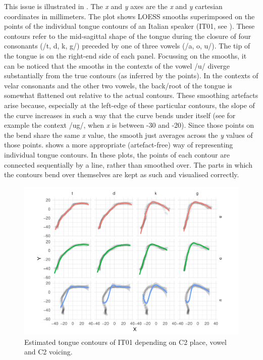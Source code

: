 \documentclass[11pt,]{article}
\begin{document}
This issue is illustrated in . The \emph{x} and
\emph{y} axes are the \emph{x} and \emph{y} cartesian coordinates in
millimeters. The plot shows LOESS smooths superimposed on the points of
the individual tongue contours of an Italian speaker (IT01, see
). These contours refer to the mid-sagittal shape of the
tongue during the closure of four consonants (/t, d, k, g/) preceded by
one of three vowels (/a, o, u/). The tip of the tongue is on the
right-end side of each panel. Focussing on the smooths, it can be
noticed that the smooths in the contexts of the vowel /u/ diverge
substantially from the true contours (as inferred by the points). In the
contexts of velar consonants and the other two vowels, the back/root of
the tongue is somewhat flattened out relative to the actual contours.
These smoothing artefacts arise because, especially at the left-edge of
these particular contours, the slope of the curve increases in such a
way that the curve bends under itself (see for example the context /ug/,
when \emph{x} is between -30 and -20). Since those points on the bend
share the same \emph{x} value, the smooth just averages across the
\emph{y} values of those points.  shows a more
appropriate (artefact-free) way of representing individual tongue
contours. In these plots, the points of each contour are connected
sequentially by a line, rather than smoothed over. The parts in which
the contours bend over themselves are kept as such and visualised
correctly.

\begin{figure}

{\centering \includegraphics[width=\linewidth]{2018-polar-gam_files/figure-latex/Figure02} 

}

\caption{Estimated tongue contours of IT01 depending on C2 place, vowel and C2 voicing.}\label{f:Figure02}
\end{figure}
\end{document}
